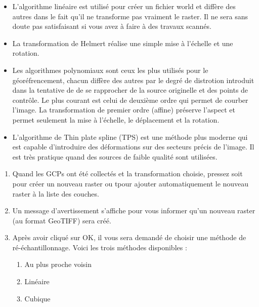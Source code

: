 \begin{itemize}[label=--]
\item L'algorithme linéaire est utilisé pour créer un fichier world et diffère des autres dans le fait qu'il ne transforme pas vraiment le raster. Il ne sera sans doute pas satisfaisant si vous avez à faire à des travaux scannés.
\item La transformation de Helmert réalise une simple mise à l'échelle et une rotation.
\item Les algorithmes polynomiaux sont ceux les plus utilisés pour le géoréfrencement, chacun diffère des autres par le degré de distrotion introduit dans la tentative de de se rapprocher de la source originelle et des points de contrôle. Le plus courant est celui de deuxième ordre qui permet de courber l'image. La transformation de premier ordre (affine) préserve l'aspect et permet seulement la mise à l'échelle, le déplacement et la rotation.
\item L'algorithme de Thin plate spline (TPS)  est une méthode plus moderne qui est capable  d'introduire des déformations sur des secteurs précis de l'image. Il est très pratique quand des sources de faible qualité sont utilisées.
\end{itemize}

\label{georeferencer_running}

\begin{enumerate}
\item Quand les GCPs ont été collectés et la transformation choisie, pressez soit  pour créer un nouveau raster ou  tpour ajouter automatiquement le nouveau raster à la liste des couches.
\item Un message d'avertissement s'affiche pour vous informer qu'un nouveau raster (au format GeoTIFF) sera créé.
\item Après avoir cliqué sur OK, il vous sera demandé de choisir une méthode de ré-échantillonna\-ge. Voici les  trois méthodes disponibles :

\begin{enumerate}
\item Au plus proche voisin
\item Linéaire
\item Cubique
\end{enumerate}
\end{enumerate}

